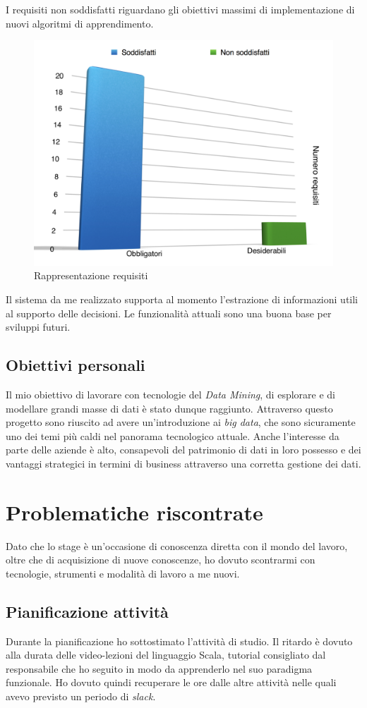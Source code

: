  I requisiti non soddisfatti riguardano gli obiettivi massimi di implementazione di nuovi algoritmi di apprendimento.
 
 
\begin{figure}[h]
\centering
\includegraphics[width=0.7\linewidth]{immagini/chartReq}
\caption[Rappresentazione requisiti]{Rappresentazione requisiti}
\label{fig:chartReq}
\end{figure}

\newpage
Il sistema da me realizzato supporta al momento l'estrazione di informazioni utili al supporto delle decisioni. Le funzionalità attuali sono una buona base per sviluppi futuri.

\subsection{Obiettivi personali} 
Il mio obiettivo di lavorare con tecnologie del \textit{Data Mining}, di esplorare e di modellare grandi masse di dati è stato dunque raggiunto. Attraverso questo progetto sono riuscito ad avere un'introduzione ai \textit{big data}, che sono sicuramente uno dei temi più caldi nel panorama tecnologico attuale. Anche l'interesse da parte delle aziende è alto, consapevoli del patrimonio di dati in loro possesso e dei vantaggi strategici in termini di business attraverso una corretta gestione dei dati. \\


\section{Problematiche riscontrate}
Dato che lo stage è un'occasione di conoscenza diretta con il mondo del lavoro, oltre che di acquisizione di nuove conoscenze, ho dovuto scontrarmi con tecnologie, strumenti e modalità di lavoro a me nuovi. 
\subsection*{Pianificazione attività}
Durante la pianificazione ho sottostimato l'attività di studio. Il ritardo è dovuto alla durata delle video-lezioni del linguaggio Scala, tutorial consigliato dal responsabile che ho seguito in modo da apprenderlo nel suo paradigma funzionale. Ho dovuto quindi recuperare le ore dalle altre attività nelle quali avevo previsto un periodo di \textit{slack}.

